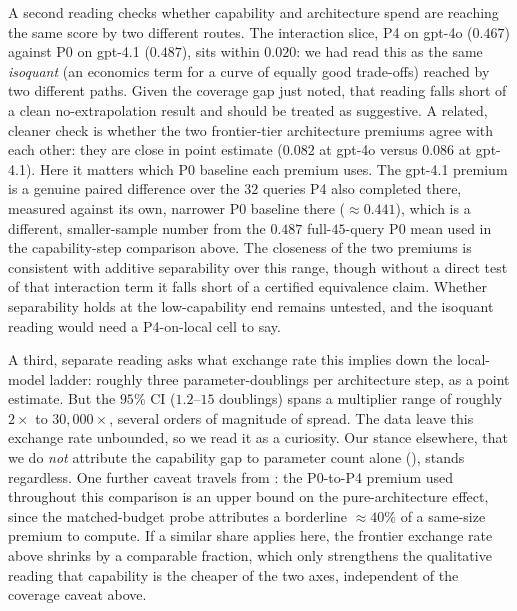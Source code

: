 \documentclass[11pt]{article}
\begin{document}
A second reading checks whether capability and architecture spend are reaching the same
score by two different routes. The interaction slice, P4 on gpt-4o ($0.467$) against P0 on
gpt-4.1 ($0.487$), sits within $0.020$: we had read this as the same \emph{isoquant} (an
economics term for a curve of equally good trade-offs) reached by two different paths.
Given the coverage gap just noted, that reading falls short of a clean
no-extrapolation result and should be treated as suggestive. A related, cleaner
check is whether the two frontier-tier architecture premiums agree with each other: they
are close in point estimate ($0.082$ at gpt-4o versus $0.086$ at gpt-4.1). Here it matters
which P0 baseline each premium uses. The gpt-4.1 premium is a genuine paired difference over
the $32$ queries P4 also completed there, measured against its own, narrower P0 baseline
there ($\approx0.441$), which is a different, smaller-sample number from the $0.487$
full-$45$-query P0 mean used in the capability-step comparison above. The closeness of the
two premiums is consistent with additive separability over this range, though without a
direct test of that interaction term it falls short of a certified equivalence claim.
Whether separability holds at the low-capability end remains untested, and the isoquant
reading would need a P4-on-local cell to say.

A third, separate reading asks what exchange rate this implies down the local-model ladder:
roughly three parameter-doublings per architecture step, as a point estimate. But the $95\%$ CI ($1.2$--$15$ doublings) spans a multiplier range of
roughly $2\times$ to $30{,}000\times$, several orders of magnitude of spread. The data
leave this exchange rate unbounded, so we read it as a curiosity. Our stance elsewhere,
that we do \emph{not} attribute the capability gap to parameter count alone
(), stands regardless. One further caveat travels from : the P0-to-P4 premium
used throughout this comparison is an upper bound on the pure-architecture effect, since
the matched-budget probe attributes a borderline $\approx\!40\%$ of a same-size premium
to compute. If a similar share applies here, the frontier
exchange rate above shrinks by a comparable fraction, which only strengthens the
qualitative reading that capability is the cheaper of the two axes, independent of the
coverage caveat above.
\end{document}

